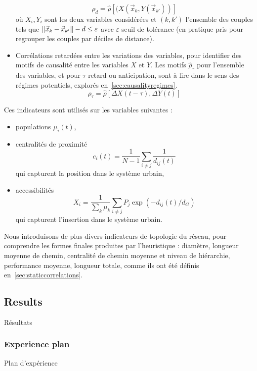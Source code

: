 \begin{itemize}
\[
\rho_d = \hat{\rho}\left[(X(\vec{x}_k,Y(\vec{x}_{k'}))\right]
\]
où $X_i, Y_i$ sont les deux variables considérées et $(k,k')$ l'ensemble des couples tels que $\| \vec{x}_k-\vec{x}_{k'} \| - d \leq \varepsilon$ avec $\varepsilon$ seuil de tolérance (en pratique pris pour regrouper les couples par déciles de distance).
\item Corrélations retardées entre les variations des variables, pour identifier des motifs de causalité entre les variables $X$ et $Y$. Les motifs $\hat{\rho}_{\tau}$ pour l'ensemble des variables, et pour $\tau$ retard ou anticipation, sont à lire dans le sens des régimes potentiels, explorés en~\ref{sec:causalityregimes}.
\[
\rho_{\tau} = \hat{\rho}\left[\Delta X(t-\tau),\Delta Y(t)\right]
\]
\end{itemize}


Ces indicateurs sont utilisés sur les variables suivantes :
\begin{itemize}
	\item populations $\mu_i(t)$,
	\item centralités de proximité
	\[c_i(t) = \frac{1}{N-1}\sum_{i\neq j} \frac{1}{d_{ij}(t)}\]
	qui capturent la position dans le système urbain,
	\item accessibilités \[X_i = \frac{1}{\sum_k \mu_k}\sum_{i\neq j} P_j \exp{\left(- d_{ij}(t)/d_G\right)}\] qui capturent l'insertion dans le système urbain.
\end{itemize}



Nous introduisons de plus divers indicateurs de topologie du réseau, pour comprendre les formes finales produites par l'heuristique : diamètre, longueur moyenne de chemin, centralité de chemin moyenne et niveau de hiérarchie, performance moyenne, longueur totale, comme ils ont été définis en~\ref{sec:staticcorrelations}.




\subsection{Results}{Résultats}


\subsubsection{Experience plan}{Plan d'expérience}

